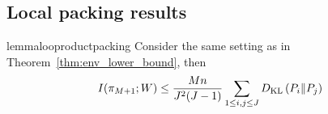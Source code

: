 

\subsection{Local packing results}\label{app:proofs:lpacking}

\begin{restatable}{lemma}{looproductpacking}\label{lemma:env_local_product_packing}
Consider the same setting as in Theorem~\ref{thm:env_lower_bound}, then
\[I(\pi_{M+1}; W) \leq \frac{Mn}{J^2(J-1)} \sum_{1 \leq i,j \leq J} D_{\mathrm{KL}}\left(P_{i}\Vert P_{j}\right)\]
\end{restatable}

